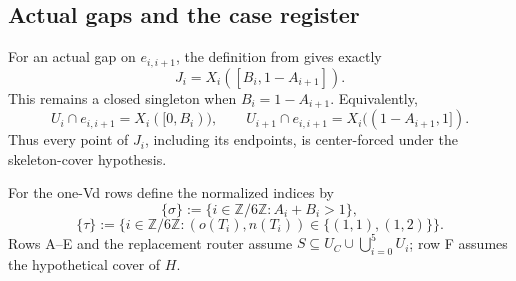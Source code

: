 \subsection{Actual gaps and the case register}
\label{subsec:trace-exact-ab-envelopes}

For an actual gap on \(e_{i,i+1}\), the definition from
 gives exactly
\[
 J_i=X_i([B_i,1-A_{i+1}]).
\]
This remains a closed singleton when \(B_i=1-A_{i+1}\).  Equivalently,
\[
 U_i\cap e_{i,i+1}=X_i([0,B_i)),
 \qquad
 U_{i+1}\cap e_{i,i+1}=X_i((1-A_{i+1},1]).
\]
Thus every point of \(J_i\), including its endpoints, is center-forced under
the skeleton-cover hypothesis.




For the one-Vd rows define the normalized indices by
\[
 \{\sigma\}:=\{i\in\mathbb Z/6\mathbb Z:A_i+B_i>1\},
\]
\[
 \{\tau\}:=
 \{i\in\mathbb Z/6\mathbb Z:
 (o(T_i),n(T_i))\in\{(1,1),(1,2)\}\}.
\]
Rows A--E and the replacement router assume
\(S\subseteq U_C\cup\bigcup_{i=0}^5U_i\); row F assumes the hypothetical
cover of \(H\).

